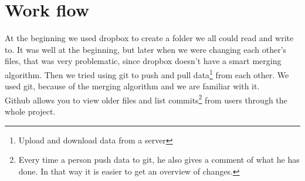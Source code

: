 \chapter{Work flow}
At the beginning we used dropbox to create a folder we all could read and write to. It was well at the beginning, but later when we were changing each other's files, that was very problematic, since dropbox doesn't have a smart merging algorithm.
Then we tried using git to push and pull data\footnote{Upload and download data from a server} from each other. We used git, because of the merging algorithm and we are familiar with it.\\
Github allows you to view older files and list commits\footnote{Every time a person push data to git, he also gives a comment of what he has done. In that way it is easier to get an overview of changes.} from users through the whole project.